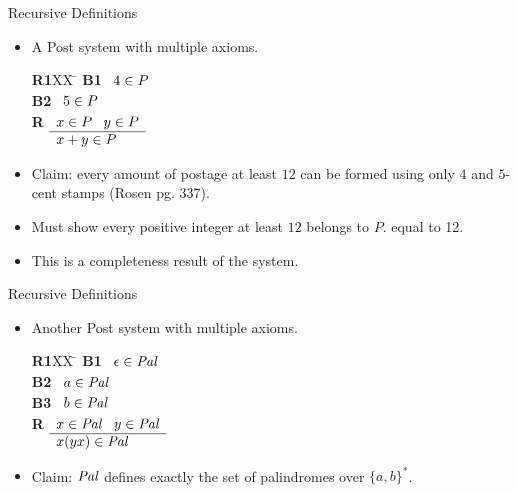 \documentclass[style=sailor,size=12pt]{powerdot}
\newcommand{\id}[1]{\mbox{\it #1\/}}
\begin{document}
\begin{wideslide}[bm=,toc=]{Recursive Definitions}
\begin{itemize}
\item A Post system with multiple axioms.
\begin{tabbing}
{\bf R1}XX \=  \kill
{\bf B1} \>
        \(\begin{array}[t]{l}
        4\in P
        \end{array}\) \\[2ex]
{\bf B2} \>
        \(\begin{array}[t]{l}
        5\in P
        \end{array}\) \\[2ex]
        
{\bf R} \>
        \(\begin{array}[t]{l}
        x \in P \;\;\;y \in P \\
        \hline
        x + y \in P
        \end{array}\)
\end{tabbing}
\item Claim: every amount of postage at least $12$ can be formed using only $4$
and $5$-cent stamps (Rosen pg. 337).
\item Must show every positive integer at least $12$ belongs to $P$. 
equal to 12.
\item This is a completeness result of the system.
\end{itemize}
\end{wideslide}

\begin{wideslide}[bm=,toc=]{Recursive Definitions}
\begin{itemize}
\item  Another Post system with multiple axioms.
\begin{tabbing}
{\bf R1}XX \=  \kill
{\bf B1} \>
        \(\begin{array}[t]{l}
        \epsilon \in \id{Pal}
        \end{array}\) \\[2ex]
{\bf B2} \>
        \(\begin{array}[t]{l}
        a\in \id{Pal}
        \end{array}\) \\[2ex]

 {\bf B3} \>
        \(\begin{array}[t]{l}
        b\in \id{Pal}
        \end{array}\) \\[2ex]
        
{\bf R} \>
        \(\begin{array}[t]{l}
        x \in \id{Pal} \;\;\;y \in \id{Pal} \\
        \hline
        x(yx) \in \id{Pal}
        \end{array}\)
\end{tabbing}
\item Claim:  $\id{Pal}$ defines exactly the set of palindromes over $\{a,b\}^*$.
\end{itemize}
\end{wideslide}
\end{document}
